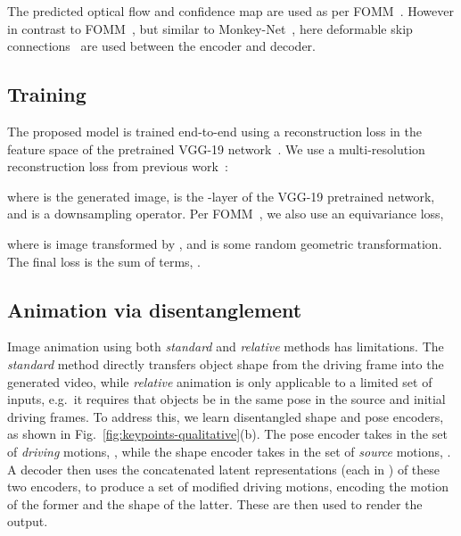 \documentclass[final]{cvpr}
\begin{document}
The predicted optical flow and confidence map are used as per FOMM~\cite{fomm}. However in contrast to FOMM~\cite{fomm}, but similar to Monkey-Net~\cite{siarohin2018animating}, here deformable skip connections~\cite{siarohin2018deformable} are used between the encoder and decoder.\vspace{-0.1cm}
\subsection{Training}
\label{sec:training}
\vspace{-0.1cm}
The proposed model is trained end-to-end using a reconstruction loss in the feature space of the pretrained VGG-19 network~\cite{johnson2016perceptual, wang2017high}. We use a multi-resolution reconstruction loss from previous work~\cite{fomm, tang2018dual}:

where  is the generated image,  is the -layer of the VGG-19 pretrained network, and  is a downsampling operator. Per FOMM~\cite{fomm}, we also use an equivariance loss,

where  is image  transformed by , and  is some random geometric transformation.
The final loss is the sum of terms, .


\vspace{-0.1cm}
\subsection{Animation via disentanglement}
\label{sec:animation}
\vspace{-0.1cm}
Image animation using both \emph{standard} and \emph{relative} methods has limitations. The \emph{standard} method directly transfers object shape from the driving frame into the generated video, 
while \emph{relative} animation is only applicable to a limited set of inputs, e.g.\ it requires that objects be in the same pose in the source  and initial driving  frames. To address this, we learn disentangled shape and pose encoders, as shown in Fig.~\ref{fig:keypoints-qualitative}(b). The pose encoder takes in the set of \emph{driving} motions, , while the shape encoder takes in the set of \emph{source} motions, . A decoder then uses the concatenated latent representations (each in ) of these two encoders, to produce a set of modified driving motions,  encoding the motion of the former and the shape of the latter. These are then used to render the output.
\end{document}
